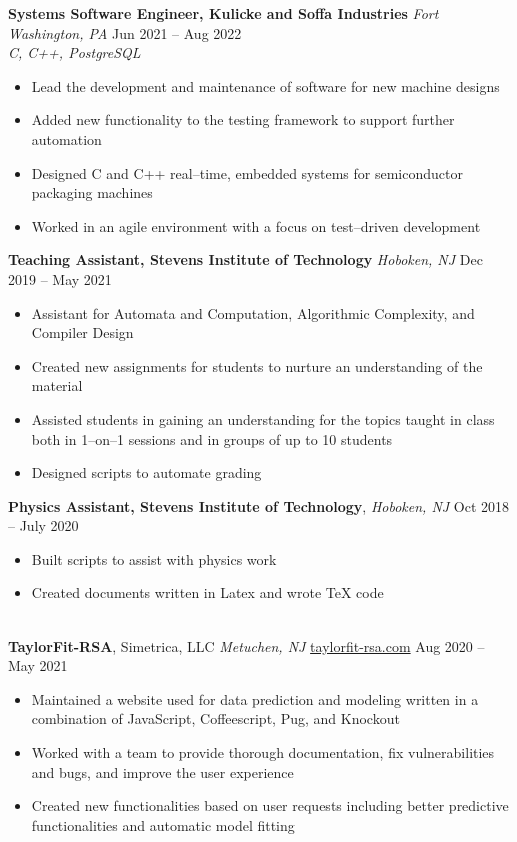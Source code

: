 \documentclass[10pt,letterpaper,roman]{moderncv}
\newcommand*{\mysection}[1]{%
  \vspace{2.5ex}
  \phantomsection{}
  \addcontentsline{toc}{part}{#1}%
  \parbox[m]{\textwidth}{\sectionstyle{#1}}\\[1ex]}
\begin{document}
\hfill

\textbf{Systems Software Engineer, Kulicke and Soffa Industries} \textit{Fort Washington, PA} \hfill Jun 2021 -- Aug 2022 \\
\textit{C, C++, PostgreSQL}
\begin{itemize}
	\item Lead the development and maintenance of software for new machine designs
	\item Added new functionality to the testing framework to support further automation
	\item Designed C and C++ real--time, embedded systems for semiconductor packaging machines
	\item Worked in an agile environment with a focus on test--driven development
\end{itemize}

\hfill

\textbf{Teaching Assistant, Stevens Institute of Technology} \textit{Hoboken, NJ} \hfill Dec 2019 -- May 2021
\begin{itemize}
	\item Assistant for Automata and Computation, Algorithmic Complexity, and Compiler Design
	\item Created new assignments for students to nurture an understanding of the material
	\item Assisted students in gaining an understanding for the topics taught in class both in 1--on--1 sessions and in groups of up to 10 students
	\item Designed scripts to automate grading
\end{itemize}

\hfill

\textbf{Physics Assistant, Stevens Institute of Technology}, \textit{Hoboken, NJ} \hfill Oct 2018 -- July 2020
\begin{itemize}
	\item Built scripts to assist with physics work
	\item Created documents written in Latex and wrote TeX code
\end{itemize}

\mysection{Projects}
\textbf{TaylorFit-RSA}, Simetrica, LLC \textit{Metuchen, NJ}  \hfill { \color{blue} \href{http://www.taylorfit-rsa.com/}{taylorfit-rsa.com} } Aug 2020 -- May 2021
\begin{itemize}
	\item Maintained a website used for data prediction and modeling written in a combination of JavaScript, Coffeescript, Pug, and Knockout
	\item Worked with a team to provide thorough documentation, fix vulnerabilities and bugs, and improve the user experience
	\item Created new functionalities based on user requests including better predictive functionalities and automatic model fitting
\end{itemize}
\end{document}
